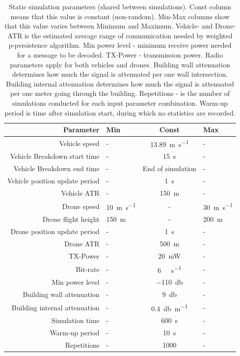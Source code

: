 \documentclass[]{nsm-thesis}
\begin{document}
\begin{table}
    \centering
    \begin{tabular}{rlcl}
        \toprule
        Parameter & Min & Const & Max \\
        \midrule
		Vehicle speed & - & \SI{13.89}{\meter\per\second} & - \\
		Vehicle Breakdown start time & - & \SI{15}{\second} & - \\
		Vehicle Breakdown end time & - & End of simulation & - \\
		Vehicle position update period & - & \SI{1}{\second} & - \\
		Vehicle \ac{ATR} & - & \SI{150}{\meter} & - \\
		\hline
        	Drone speed & \SI{10}{\meter\per\second} & - & \SI{30}{\meter\per\second} \\
        	Drone flight height & \SI{150}{\meter} & - & \SI{200}{\meter} \\
		Drone position update period & - & \SI{1}{\second} & - \\
		Drone \ac{ATR} & - & \SI{500}{\meter} & - \\
		\hline
		TX-Power & - & \SI{20}{\milli\watt} & - \\
		Bit-rate & - & \SI{6}{\mega\bit\per\second} & - \\
		Min power level  & - & \SI{-110}{\decibel} & - \\
		\hline
		Building wall attenuation  & - & \SI{9}{\decibel} & - \\
		Building internal attenuation & - & \SI{0.4}{\decibel\per\meter} & - \\
		\hline
		Simulation time & - & \SI{600}{\second} & - \\
		Warm-up period & - & \SI{10}{\second} & - \\
		Repetitions & - & 1000 & - \\
		
        \bottomrule
    \end{tabular}
    \caption{Static simulation parameters (shared between simulations). Const column means that this value is constant (non-random). Min-Max columns show that this value varies between Minimum and Maximum. Vehicle- and Drone- \ac{ATR} is the estimated average range of communication needed by weighted p-persistence algorithm. Min power level - minimum receive power needed for a message to be decoded. TX-Power - transmission power. Radio parameters apply for both vehicles and drones. Building wall attenuation determines how much the signal is attenuated per one wall intersection. Building internal attenuation determines how much the signal is attenuated per one meter going through the building. Repetitions - is the number of simulations conducted for each input parameter combination. Warm-up period is time after simulation start, during which no statistics are recorded.}
    \label{tab:simulationparams}
\end{table}
\end{document}
